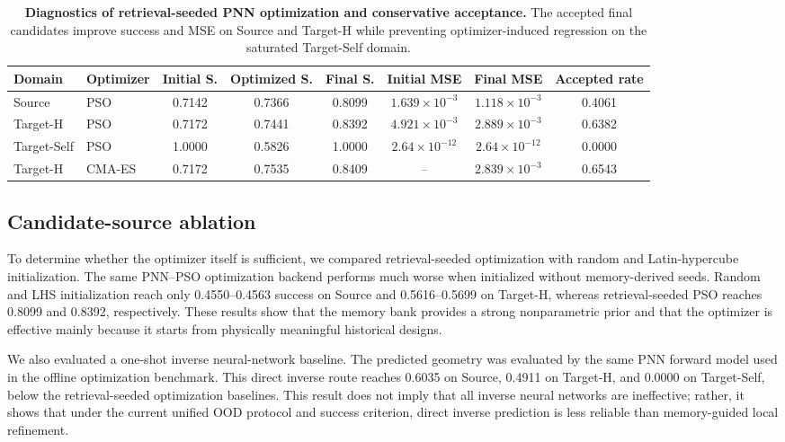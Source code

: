 \documentclass[final,1p,times]{elsarticle}
\begin{document}
\begin{table}[htbp!]
\centering
\caption{\textbf{Diagnostics of retrieval-seeded PNN optimization and conservative acceptance.}
The accepted final candidates improve success and MSE on Source and Target-H while preventing optimizer-induced regression on the saturated Target-Self domain.}
\label{tab:si_phase2_optimizer_diagnostics}
\footnotesize
\setlength{\tabcolsep}{3.5pt}
\renewcommand{\arraystretch}{1.12}
\begin{tabular}{llcccccc}
\toprule
Domain & Optimizer & Initial S. & Optimized S. & Final S. & Initial MSE & Final MSE & Accepted rate \\
\midrule
Source & PSO & 0.7142 & 0.7366 & 0.8099 & $1.639\times10^{-3}$ & $1.118\times10^{-3}$ & 0.4061 \\
Target-H & PSO & 0.7172 & 0.7441 & 0.8392 & $4.921\times10^{-3}$ & $2.889\times10^{-3}$ & 0.6382 \\
Target-Self & PSO & 1.0000 & 0.5826 & 1.0000 & $2.64\times10^{-12}$ & $2.64\times10^{-12}$ & 0.0000 \\
Target-H & CMA-ES & 0.7172 & 0.7535 & 0.8409 & -- & $2.839\times10^{-3}$ & 0.6543 \\
\bottomrule
\end{tabular}
\end{table}

\subsection{Candidate-source ablation}

To determine whether the optimizer itself is sufficient, we compared retrieval-seeded optimization with random and Latin-hypercube initialization. The same PNN--PSO optimization backend performs much worse when initialized without memory-derived seeds. Random and LHS initialization reach only 0.4550--0.4563 success on Source and 0.5616--0.5699 on Target-H, whereas retrieval-seeded PSO reaches 0.8099 and 0.8392, respectively. These results show that the memory bank provides a strong nonparametric prior and that the optimizer is effective mainly because it starts from physically meaningful historical designs.

We also evaluated a one-shot inverse neural-network baseline. The predicted geometry was evaluated by the same PNN forward model used in the offline optimization benchmark. This direct inverse route reaches 0.6035 on Source, 0.4911 on Target-H, and 0.0000 on Target-Self, below the retrieval-seeded optimization baselines. This result does not imply that all inverse neural networks are ineffective; rather, it shows that under the current unified OOD protocol and success criterion, direct inverse prediction is less reliable than memory-guided local refinement.
\end{document}
